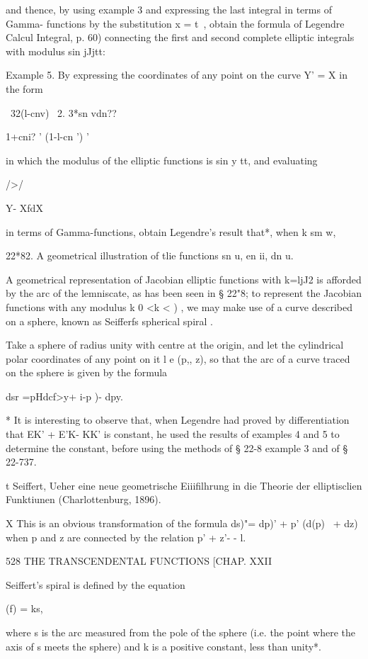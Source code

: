 and thence, by using example 3 and expressing the last integral in
terms of Gamma- functions by the substitution x = t~, obtain the
formula of Legendre Calcul Integral, p. 60) connecting the first and
second complete elliptic integrals with modulus sin jJjtt:

Example 5. By expressing the coordinates of any point on the curve Y'
= X in the form

 \ 32(l-cnv) \ 2. 3*sn vdn??

1+cni? ' (1-l-cn ') '

in which the modulus of the elliptic functions is sin y tt, and
evaluating

 />/

Y- XfdX

in terms of Gamma-functions, obtain Legendre's result that*, when k sm
w,

22*82. A geometrical illustration of tlie functions sn u, en ii, dn u.

A geometrical representation of Jacobian elliptic functions with
k=ljJ2 is afforded by the arc of the lemniscate, as has been seen in §
22"8; to represent the Jacobian functions with any modulus k 0 <k < )
, we may make use of a curve described on a sphere, known as Seifferfs
spherical spiral .

Take a sphere of radius unity with centre at the origin, and let the
cylindrical polar coordinates of any point on it l e (p,, z), so that
the arc of a curve traced on the sphere is given by the formula \

 dsr =pHdcf>y+ i-p )- dpy.

* It is interesting to observe that, when Legendre had proved by
differentiation that EK' + E'K- KK' is constant, he used the results
of examples 4 and 5 to determine the constant, before using the
methods of § 22-8 example 3 and of § 22-737.

t Seiffert, Ueher eine neue geometrische Eiiifilhrung in die Theorie
der elliptisclien Funktiunen (Charlottenburg, 1896).

X This is an obvious transformation of the formula ds)"= dp)' + p'
(d(p)~ + dz) when p and z are connected by the relation p' + z'- - l.

528 THE TRANSCENDENTAL FUNCTIONS [CHAP. XXII

Seiffert's spiral is defined by the equation

(f) = ks,

where s is the arc measured from the pole of the sphere (i.e. the
point where the axis of s meets the sphere) and k is a positive
constant, less than unity*.


